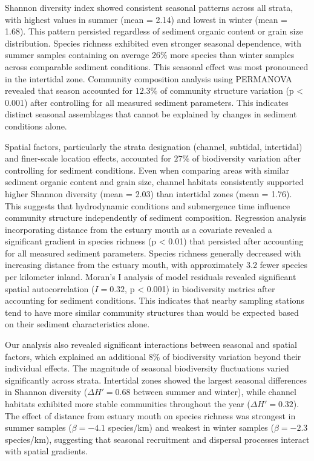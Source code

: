 \documentclass[12pt]{article}
\begin{document}
{\qquad Shannon diversity index showed consistent seasonal patterns across all
strata, with highest values in summer (mean = 2.14) and lowest in winter (mean =
1.68). This pattern persisted regardless of sediment organic content or grain
size distribution. Species richness exhibited even stronger seasonal dependence,
with summer samples containing on average $26\%$ more species than winter
samples across comparable sediment conditions. This seasonal effect was most
pronounced in the intertidal zone. Community composition analysis using
PERMANOVA revealed that season accounted for $12.3\%$ of community structure
variation (p < 0.001) after controlling for all measured sediment parameters.
This indicates distinct seasonal assemblages that cannot be explained by changes
in sediment conditions alone.

\qquad Spatial factors, particularly the strata designation (channel, subtidal,
intertidal) and finer-scale location effects, accounted for $27\%$ of
biodiversity variation after controlling for sediment conditions. Even when
comparing areas with similar sediment organic content and grain size, channel
habitats consistently supported higher Shannon diversity (mean = 2.03) than
intertidal zones (mean = 1.76). This suggests that hydrodynamic conditions and
submergence time influence community structure independently of sediment
composition. Regression analysis incorporating distance from the estuary mouth
as a covariate revealed a significant gradient in species richness (p < 0.01)
that persisted after accounting for all measured sediment parameters. Species
richness generally decreased with increasing distance from the estuary mouth,
with approximately 3.2 fewer species per kilometer inland. Moran's I analysis of
model residuals revealed significant spatial autocorrelation ($I = 0.32$, p <
0.001) in biodiversity metrics after accounting for sediment conditions. This
indicates that nearby sampling stations tend to have more similar community
structures than would be expected based on their sediment characteristics alone.

\qquad Our analysis also revealed significant interactions between seasonal and
spatial factors, which explained an additional $8\%$ of biodiversity variation
beyond their individual effects. The magnitude of seasonal biodiversity
fluctuations varied significantly across strata. Intertidal zones showed the
largest seasonal differences in Shannon diversity ($\Delta H' = 0.68$ between
summer and winter), while channel habitats exhibited more stable communities
throughout the year ($\Delta H' = 0.32$). The effect of distance from estuary
mouth on species richness was strongest in summer samples ($\beta = -4.1$
species/km) and weakest in winter samples ($\beta = -2.3$ species/km),
suggesting that seasonal recruitment and dispersal processes interact with
spatial gradients.

}
\end{document}
